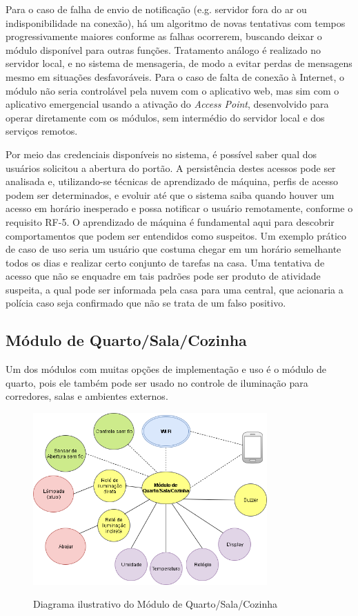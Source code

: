 Para o caso de falha de envio de notificação (e.g. servidor fora do ar ou indisponibilidade na conexão), há um algoritmo de novas tentativas com tempos progressivamente maiores conforme as falhas ocorrerem, buscando deixar o módulo disponível para outras funções. Tratamento análogo é realizado no servidor local, e no sistema de mensageria, de modo a evitar perdas de mensagens mesmo em situações desfavoráveis. Para o caso de falta de conexão à Internet, o módulo não seria controlável pela nuvem com o aplicativo web, mas sim com o aplicativo emergencial usando a ativação do \textit{Access Point}, desenvolvido para operar diretamente com os módulos, sem intermédio do servidor local e dos serviços remotos.

Por meio das credenciais disponíveis no sistema, é possível saber qual dos usuários solicitou a abertura do portão. A persistência destes acessos pode ser analisada e, utilizando-se técnicas de aprendizado de máquina, perfis de acesso podem ser determinados, e evoluir até que o sistema saiba quando houver um acesso em horário inesperado e possa notificar o usuário remotamente, conforme o requisito RF-5. O aprendizado de máquina é fundamental aqui para descobrir comportamentos que podem ser entendidos como suspeitos. Um exemplo prático de caso de uso seria um usuário que costuma chegar em um horário semelhante todos os dias e realizar certo conjunto de tarefas na casa. Uma tentativa de acesso que não se enquadre em tais padrões pode ser produto de atividade suspeita, a qual pode ser informada pela casa para uma central, que acionaria a polícia caso seja confirmado que não se trata de um falso positivo.

\subsection{Módulo de Quarto/Sala/Cozinha}
Um dos módulos com muitas opções de implementação e uso é o módulo de quarto, pois ele também pode ser usado no controle de iluminação para corredores, salas e ambientes externos.

\begin{figure}[H]
	\centering
	\caption{Diagrama ilustrativo do Módulo de Quarto/Sala/Cozinha}
	\includegraphics[width=0.8\textwidth]{diagramaModuloQuarto}
	\label{fig:diagramaModuloQuarto}
\end{figure}

